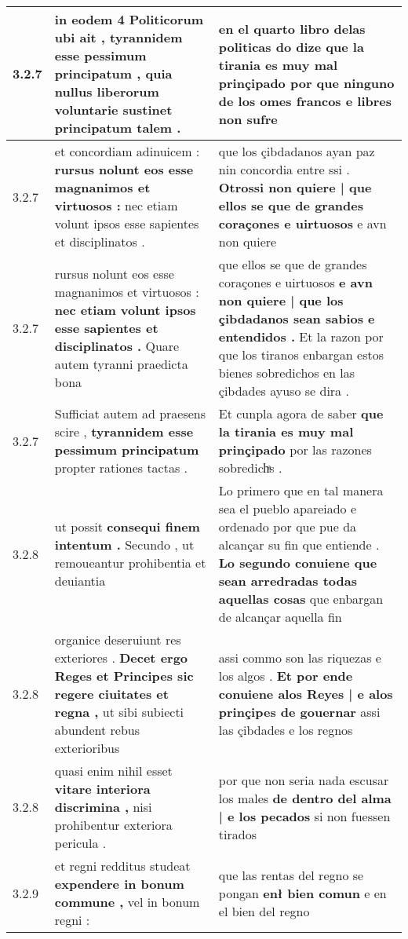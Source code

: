 \begin{tabular}{|p{1cm}|p{6.5cm}|p{6.5cm}|}
3.2.7 & in eodem 4 Politicorum ubi ait , \textbf{ tyrannidem esse pessimum principatum , } quia nullus liberorum voluntarie sustinet principatum talem . & en el quarto libro delas politicas \textbf{ do dize que la tirania es muy mal prinçipado } por que ninguno de los omes francos e libres non sufre \\\hline
3.2.7 & et concordiam adinuicem : \textbf{ rursus nolunt eos esse magnanimos et virtuosos : } nec etiam volunt ipsos esse sapientes et disciplinatos . & que los çibdadanos ayan paz nin concordia entre ssi . \textbf{ Otrossi non quiere | que ellos se que de grandes coraçones e uirtuosos } e avn non quiere \\\hline
3.2.7 & rursus nolunt eos esse magnanimos et virtuosos : \textbf{ nec etiam volunt ipsos esse sapientes et disciplinatos . } Quare autem tyranni praedicta bona & que ellos se que de grandes coraçones e uirtuosos \textbf{ e avn non quiere | que los çibdadanos sean sabios e entendidos . } Et la razon por que los tiranos enbargan estos bienes sobredichos en las çibdades ayuso se dira . \\\hline
3.2.7 & Sufficiat autem ad praesens scire , \textbf{ tyrannidem esse pessimum principatum } propter rationes tactas . & Et cunpla agora de saber \textbf{ que la tirania es muy mal prinçipado } por las razones sobredichͣs . \\\hline
3.2.8 & ut possit \textbf{ consequi finem intentum . } Secundo , ut remoueantur prohibentia et deuiantia & Lo primero que en tal manera sea el pueblo apareiado e ordenado por que pue da alcançar su fin que entiende . \textbf{ Lo segundo conuiene que sean arredradas todas aquellas cosas } que enbargan de alcançar aquella fin \\\hline
3.2.8 & organice deseruiunt res exteriores . \textbf{ Decet ergo Reges et Principes sic regere ciuitates et regna , } ut sibi subiecti abundent rebus exterioribus & assi commo son las riquezas e los algos . \textbf{ Et por ende conuiene alos Reyes | e alos prinçipes de gouernar } assi las çibdades e los regnos \\\hline
3.2.8 & quasi enim nihil esset \textbf{ vitare interiora discrimina , } nisi prohibentur exteriora pericula . & por que non seria nada escusar los males \textbf{ de dentro del alma | e los pecados } si non fuessen tirados \\\hline
3.2.9 & et regni redditus studeat \textbf{ expendere in bonum commune , } vel in bonum regni : & que las rentas del regno se pongan \textbf{ enł bien comun } e en el bien del regno \\\hline

\end{tabular}
